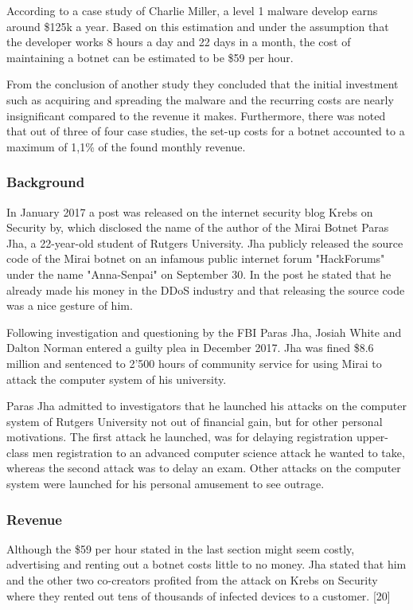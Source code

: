 According to a case study of Charlie Miller, a level 1 malware develop earns around \$125k a year. Based on this estimation and under the assumption that the developer works 8 hours a day and 22 days in a month, the cost of maintaining a botnet can be estimated to be \$59 per hour.

From the conclusion of another study they concluded that the initial investment such as acquiring and spreading the malware and the recurring costs are nearly insignificant compared to the revenue it makes. Furthermore, there was noted that out of three of four case studies, the set-up costs for a botnet accounted to a maximum of 1,1\% of the found monthly revenue.

	\subsubsection{Background}
	In January 2017 a post was released on the internet security blog Krebs on Security by, which disclosed the name of the author of the Mirai Botnet Paras Jha, a 22-year-old student of Rutgers University. Jha publicly released the source code of the Mirai botnet on an infamous public internet forum "HackForums" under the name "Anna-Senpai" on September 30. In the post he stated that he already made his money in the DDoS industry and that releasing the source code was a nice gesture of him. \cite{Krebs17}

Following investigation and questioning by the FBI Paras Jha, Josiah White and Dalton Norman entered a guilty plea in December 2017. \cite{USDepartment17} Jha was fined \$8.6 million and sentenced to 2'500 hours of community service for using Mirai to attack the computer system of his university. \cite{Krebs18}

Paras Jha admitted to investigators that he launched his attacks on the computer system of Rutgers University not out of financial gain, but for other personal motivations. The first attack he launched, was for delaying registration upper-class men registration to an advanced computer science attack he wanted to take, whereas the second attack was to delay an exam. Other attacks on the computer system were launched for his personal amusement to see outrage. \cite{Krebs18}

	\subsubsection{Revenue}
	Although the \$59 per hour stated in the last section might seem costly, advertising and renting out a botnet costs little to no money. Jha stated that him and the other two co-creators profited from the attack on Krebs on Security where they rented out tens of thousands of infected devices to a customer. [20]
	
